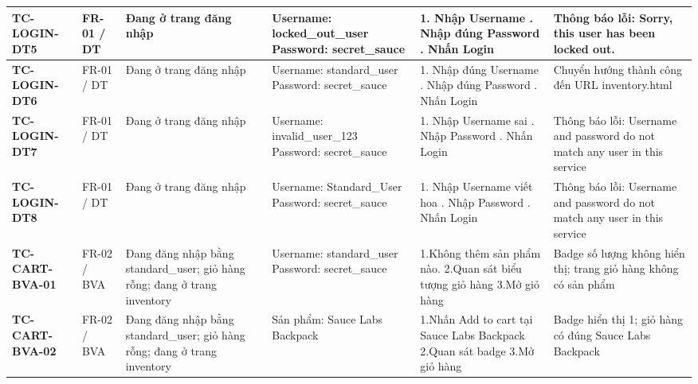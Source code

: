 {\begin{longtable}{|L{3.5cm}|L{1.9cm}|L{4.6cm}|L{3.7cm}|L{5.1cm}|L{5.1cm}|}
\hline
\textbf{\mbox{TC-LOGIN-DT5}} & FR-01 / DT & Đang ở trang đăng nhập & Username: locked\_\allowbreak{}out\_\allowbreak{}user \newline Password: secret\_\allowbreak{}sauce & 1. Nhập Username . Nhập đúng Password . Nhấn Login & Thông báo lỗi: Sorry, this user has been locked out. \\
\hline
\textbf{\mbox{TC-LOGIN-DT6}} & FR-01 / DT & Đang ở trang đăng nhập & Username: standard\_\allowbreak{}user \newline Password: secret\_\allowbreak{}sauce & 1. Nhập đúng Username . Nhập đúng Password . Nhấn Login & Chuyển hướng thành công đến URL inventory.html \\
\hline
\textbf{\mbox{TC-LOGIN-DT7}} & FR-01 / DT & Đang ở trang đăng nhập & Username: invalid\_\allowbreak{}user\_\allowbreak{}123 \newline Password: secret\_\allowbreak{}sauce & 1. Nhập Username sai . Nhập Password . Nhấn Login & Thông báo lỗi: Username and password do not match any user in this service \\
\hline
\textbf{\mbox{TC-LOGIN-DT8}} & FR-01 / DT & Đang ở trang đăng nhập & Username: Standard\_\allowbreak{}User \newline Password: secret\_\allowbreak{}sauce & 1. Nhập Username viết hoa . Nhập Password . Nhấn Login & Thông báo lỗi: Username and password do not match any user in this service \\
\hline
\textbf{\mbox{TC-CART-BVA-01}} & FR-02 / BVA & Đang đăng nhập bằng standard\_\allowbreak{}user; giỏ hàng rỗng; đang ở trang inventory & Username: standard\_\allowbreak{}user \newline Password: secret\_\allowbreak{}sauce & 1.Không thêm sản phẩm nào. \newline 2.Quan sát biểu tượng giỏ hàng \newline 3.Mở giỏ hàng & Badge số lượng không hiển thị; trang giỏ hàng không có sản phẩm \\
\hline
\textbf{\mbox{TC-CART-BVA-02}} & FR-02 / BVA & Đang đăng nhập bằng standard\_\allowbreak{}user; giỏ hàng rỗng; đang ở trang inventory & Sản phẩm: Sauce Labs Backpack & 1.Nhấn Add to cart tại Sauce Labs Backpack \newline 2.Quan sát badge \newline 3.Mở giỏ hàng & Badge hiển thị 1; giỏ hàng có đúng Sauce Labs Backpack \\

\end{longtable}}

